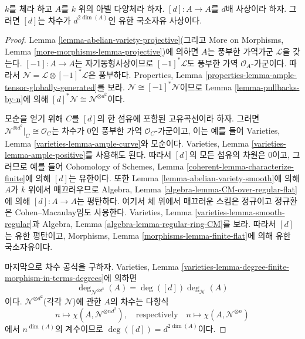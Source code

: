 \begin{lemma}
\label{lemma-degree-multiplication-by-d}
$k$를 체라 하고 $A$를 $k$ 위의 아벨 다양체라 하자. $[d] : A \to A$를 $d$배 사상이라 하자.
그러면 $[d]$는 차수가 $d^{2\dim(A)}$인 유한 국소자유 사상이다.
\end{lemma}

\begin{proof}
Lemma \ref{lemma-abelian-variety-projective}(그리고 More on Morphisms, Lemma
\ref{more-morphisms-lemma-projective})에 의하면 $A$는 풍부한 가역가군 $\mathcal{L}$을 갖는다.
$[-1] : A \to A$는 자기동형사상이므로 $[-1]^*\mathcal{L}$도 풍부한 가역 $\mathcal{O}_A$-가군이다.
따라서 $\mathcal{N} = \mathcal{L} \otimes [-1]^*\mathcal{L}$은 풍부하다. Properties, Lemma
\ref{properties-lemma-ample-tensor-globally-generated}를 보라. $\mathcal{N} \cong [-1]^*\mathcal{N}$이므로 Lemma
\ref{lemma-pullbacks-by-n}에 의해 $[d]^*\mathcal{N} \cong \mathcal{N}^{\otimes d^2}$이다.

\medskip\noindent
모순을 얻기 위해 $C$를 $[d]$의 한 섬유에 포함된 고유곡선이라 하자. 그러면
$\mathcal{N}^{\otimes d^2}|_C \cong \mathcal{O}_C$는 차수가 $0$인 풍부한 가역 $\mathcal{O}_C$-가군이고,
이는 예를 들어 Varieties, Lemma \ref{varieties-lemma-ample-curve}와 모순이다.
Varieties, Lemma \ref{varieties-lemma-ample-positive}를 사용해도 된다. 따라서 $[d]$의 모든 섬유의 차원은 $0$이고,
그러므로 예를 들어 Cohomology of Schemes, Lemma \ref{coherent-lemma-characterize-finite}에 의해
$[d]$는 유한이다. 또한 Lemma \ref{lemma-abelian-variety-smooth}에 의해 $A$가 $k$ 위에서 매끄러우므로
Algebra, Lemma \ref{algebra-lemma-CM-over-regular-flat}에 의해 $[d] : A \to A$는 평탄하다.
여기서 체 위에서 매끄러운 스킴은 정규이고 정규환은 Cohen--Macaulay임도 사용한다. Varieties, Lemma
\ref{varieties-lemma-smooth-regular}과 Algebra, Lemma \ref{algebra-lemma-regular-ring-CM}를 보라. 따라서 $[d]$는 유한 평탄이고,
Morphisms, Lemma \ref{morphisms-lemma-finite-flat}에 의해 유한 국소자유이다.

\medskip\noindent
마지막으로 차수 공식을 구하자. Varieties, Lemma
\ref{varieties-lemma-degree-finite-morphism-in-terms-degrees}에 의하면
$$
\deg_{\mathcal{N}^{\otimes d^2}}(A) = \deg([d]) \deg_\mathcal{N}(A)
$$
이다. $\mathcal{N}^{\otimes d^2}$(각각 $\mathcal{N}$)에 관한 $A$의 차수는 다항식
$$
n \longmapsto \chi(A, \mathcal{N}^{\otimes nd^2}),\quad
\text{respectively}\quad n \longmapsto \chi(A, \mathcal{N}^{\otimes n})
$$
에서 $n^{\dim(A)}$의 계수이므로 $\deg([d]) = d^{2 \dim(A)}$이다.
\end{proof}

